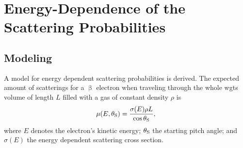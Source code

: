 \section{Energy-Dependence of the Scattering Probabilities}
\subsection{Modeling}
\label{sec:energyDepOfScatProbsAppendix}
A model for energy dependent scattering probabilities is derived. The expected amount of scatterings for a $\upbeta$ electron when traveling  through the whole \gls{wgts} volume of length $L$ filled with a gas of constant density $\rho$ is
\begin{equation}
    \mu(E,\theta_\mathrm{S}) =
    \frac{\sigma(E)\rho L}{\cos\theta_\mathrm{S}},
\end{equation}
where $E$ denotes the electron's kinetic energy; $\theta_\mathrm{S}$ the starting pitch angle; and $\sigma(E)$ the energy dependent scattering cross section.


